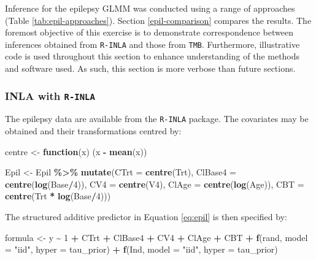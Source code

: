 \documentclass[a4paper, nobind]{templates/ociamthesis}
\newenvironment{Shaded}{\begin{snugshade}}{\end{snugshade}}
\newcommand{\AttributeTok}[1]{\textcolor[rgb]{0.13,0.29,0.53}{#1}}
\newcommand{\ControlFlowTok}[1]{\textcolor[rgb]{0.13,0.29,0.53}{\textbf{#1}}}
\newcommand{\DecValTok}[1]{\textcolor[rgb]{0.00,0.00,0.81}{#1}}
\newcommand{\FunctionTok}[1]{\textcolor[rgb]{0.13,0.29,0.53}{\textbf{#1}}}
\newcommand{\NormalTok}[1]{#1}
\newcommand{\OtherTok}[1]{\textcolor[rgb]{0.56,0.35,0.01}{#1}}
\newcommand{\SpecialCharTok}[1]{\textcolor[rgb]{0.81,0.36,0.00}{\textbf{#1}}}
\newcommand{\StringTok}[1]{\textcolor[rgb]{0.31,0.60,0.02}{#1}}
\renewenvironment{Shaded}
{
  \vspace{10pt}%
  \begin{snugshade}%
}{%
  \end{snugshade}%
  \vspace{8pt}%
}
\begin{document}
Inference for the epilepsy GLMM was conducted using a range of approaches (Table \ref{tab:epil-approaches}).
Section \ref{epil-comparison} compares the results.
The foremost objective of this exercise is to demonstrate correspondence between inferences obtained from \texttt{R-INLA} and those from \texttt{TMB}.
Furthermore, illustrative code is used throughout this section to enhance understanding of the methods and software used.
As such, this section is more verbose than future sections.

\hypertarget{epil-inla}{%
\subsubsection{\texorpdfstring{INLA with \texttt{R-INLA}}{INLA with R-INLA}}\label{epil-inla}}

The epilepsy data are available from the \texttt{R-INLA} package.
The covariates may be obtained and their transformations centred by:

\begin{Shaded}
\begin{Highlighting}[]
\NormalTok{centre }\OtherTok{\textless{}{-}} \ControlFlowTok{function}\NormalTok{(x) (x }\SpecialCharTok{{-}} \FunctionTok{mean}\NormalTok{(x))}

\NormalTok{Epil }\OtherTok{\textless{}{-}}\NormalTok{ Epil }\SpecialCharTok{\%\textgreater{}\%}
  \FunctionTok{mutate}\NormalTok{(}\AttributeTok{CTrt    =} \FunctionTok{centre}\NormalTok{(Trt),}
         \AttributeTok{ClBase4 =} \FunctionTok{centre}\NormalTok{(}\FunctionTok{log}\NormalTok{(Base}\SpecialCharTok{/}\DecValTok{4}\NormalTok{)),}
         \AttributeTok{CV4     =} \FunctionTok{centre}\NormalTok{(V4),}
         \AttributeTok{ClAge   =} \FunctionTok{centre}\NormalTok{(}\FunctionTok{log}\NormalTok{(Age)),}
         \AttributeTok{CBT     =} \FunctionTok{centre}\NormalTok{(Trt }\SpecialCharTok{*} \FunctionTok{log}\NormalTok{(Base}\SpecialCharTok{/}\DecValTok{4}\NormalTok{)))}
\end{Highlighting}
\end{Shaded}

The structured additive predictor in Equation \eqref{eq:epil} is then specified by:

\begin{Shaded}
\begin{Highlighting}[]
\NormalTok{formula }\OtherTok{\textless{}{-}}\NormalTok{ y }\SpecialCharTok{\textasciitilde{}} \DecValTok{1} \SpecialCharTok{+}\NormalTok{ CTrt }\SpecialCharTok{+}\NormalTok{ ClBase4 }\SpecialCharTok{+}\NormalTok{ CV4 }\SpecialCharTok{+}\NormalTok{ ClAge }\SpecialCharTok{+}\NormalTok{ CBT }\SpecialCharTok{+}
  \FunctionTok{f}\NormalTok{(rand, }\AttributeTok{model =} \StringTok{"iid"}\NormalTok{, }\AttributeTok{hyper =}\NormalTok{ tau\_prior) }\SpecialCharTok{+}  
  \FunctionTok{f}\NormalTok{(Ind,  }\AttributeTok{model =} \StringTok{"iid"}\NormalTok{, }\AttributeTok{hyper =}\NormalTok{ tau\_prior)}
\end{Highlighting}
\end{Shaded}
\end{document}
